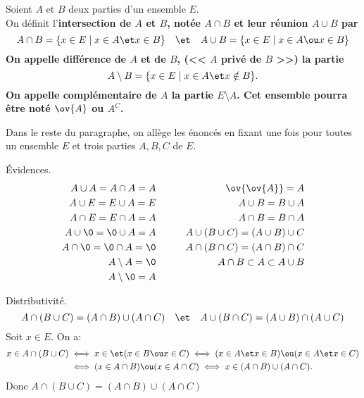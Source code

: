 \documentclass[11pt]{article}
\begin{document}
\begin{defi}{}{}
    Soient $A$ et $B$ deux parties d'un ensemble $E$.\\
    On définit l'\bf{intersection} de $A$ et $B$, notée $A\cap B$ et leur \bf{réunion} $A\cup B$ par
    \begin{equation*}
        A \cap B = \{x\in E\mid x\in A\et x\in B\}\quad\et\quad A\cup B=\{x\in E\mid x\in A\ou x\in B\}
    \end{equation*}
    On appelle \bf{différence} de $A$ et de $B$, (<< $A$ privé de $B$ >>) la partie
    \begin{equation*}
        A\setminus B = \{x\in E\mid x\in A\et x\notin B\}.
    \end{equation*}
    On appelle \bf{complémentaire} de $A$ la partie $E\setminus A$. Cet ensemble pourra être noté $\ov{A}$ ou $A^C$.
\end{defi}
Dans le reste du paragraphe, on allège les énoncés en fixant une fois pour toutes un ensemble $E$ et trois parties $A,B,C$ de $E$.
\begin{prop}{Évidences.}{}
    \begin{equation*}
        \begin{aligned}
            A\cup A= A\cap A = A&\qquad &\ov{\ov{A}}=A\\
            A\cup E=E\cup A=E& \qquad &A\cup B=B\cup A\\
            A\cap E=E\cap A=A& \qquad &A\cap B=B\cap A\\
            A\cup\0=\0\cup A=A&\qquad &A\cup(B\cup C)=(A\cup B)\cup C\\
            A\cap\0=\0\cap A=\0&\qquad &A\cap(B\cap C)=(A\cap B)\cap C\\
            A\setminus A=\0&\qquad &A\cap B\subset A\subset A\cup B\\
            A\setminus\0=A&
        \end{aligned}
    \end{equation*}
\end{prop}

\begin{prop}{Distributivité.}{}
    \begin{equation*}
        A\cap(B\cup C)=(A\cap B)\cup(A\cap C)\quad\et\quad A\cup(B\cap C)=(A\cup B)\cap(A\cup C)
    \end{equation*}
    \tcblower
    Soit $x\in E$. On a:
    \begin{align*}
        x\in A\cap(B\cup C) &\iff x\in \et (x\in B \ou  x\in C) \iff (x\in A\et x\in B)\ou(x\in A\et x\in C)\\
        &\iff(x\in A\cap B)\ou(x\in A\cap C) \iff x\in(A\cap B)\cup(A\cap C).
    \end{align*}
    Donc $A\cap(B\cup C)=(A\cap B)\cup(A\cap C)$
\end{prop}
\end{document}
